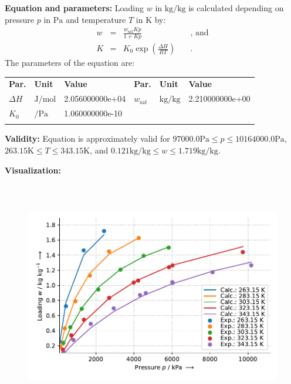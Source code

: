 \textbf{Equation and parameters:}
\newline
%
Loading $w$ in $\si{\kilogram\per\kilogram}$ is calculated depending on pressure $p$ in $\si{\pascal}$ and temperature $T$ in $\si{\kelvin}$ by:
%
\begin{equation*}
\begin{split}
w &=& \frac{w_\mathrm{sat} K p}{1 + K p} & \quad\text{, and} \\
K &=& K_0 \exp \left( \frac{\Delta H}{R T} \right) & \quad\text{.}
\end{split}
\end{equation*}
%
The parameters of the equation are:
%
\begin{longtable}[l]{lll|lll}
\toprule
\addlinespace
\textbf{Par.} & \textbf{Unit} & \textbf{Value} &	\textbf{Par.} & \textbf{Unit} & \textbf{Value} \\
\addlinespace
\midrule
\endhead

\bottomrule
\endfoot
\bottomrule
\endlastfoot
\addlinespace

$\Delta H$ & $\si{\joule\per\mole}$ & 2.056000000e+04 & $w_\mathrm{sat}$ & $\si{\kilogram\per\kilogram}$ & 2.210000000e+00 \\
$K_0$ & $\si{\per\pascal}$ & 1.060000000e-10 & & & \\

\addlinespace\end{longtable}

\textbf{Validity:}
\newline
Equation is approximately valid for $97000.0 \si{\pascal} \leq p \leq 10164000.0 \si{\pascal}$,  $263.15 \si{\kelvin} \leq T \leq 343.15 \si{\kelvin}$, and $0.121 \si{\kilogram\per\kilogram} \leq w \leq 1.719 \si{\kilogram\per\kilogram}$.
\newline

\textbf{Visualization:}
%
\begin{figure}[!htp]
{\noindent\includegraphics[height=10cm, keepaspectratio]{figs/ads/ads_CarbonDioxide_activated_carbon_powder_Maxsorb_III_Langmuir_1.pdf}}
\end{figure}
%

